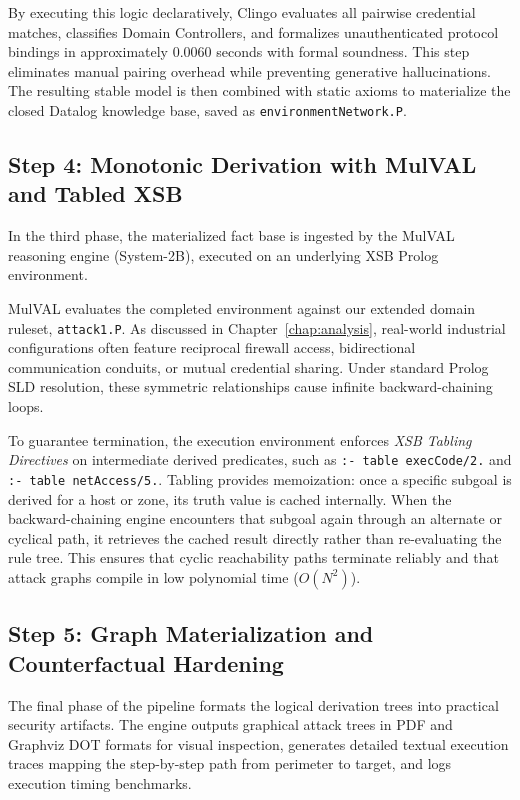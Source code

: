 \documentclass[target=mst,aauheader=aics,style=]{thud}
\begin{document}
By executing this logic declaratively, Clingo evaluates all pairwise credential matches, classifies Domain Controllers, and formalizes unauthenticated protocol bindings in approximately $0.0060$ seconds with formal soundness. This step eliminates manual pairing overhead while preventing generative hallucinations. The resulting stable model is then combined with static axioms to materialize the closed Datalog knowledge base, saved as \texttt{environmentNetwork.P}.

\subsection{Step 4: Monotonic Derivation with MulVAL and Tabled XSB}
In the third phase, the materialized fact base is ingested by the MulVAL reasoning engine (System-2B), executed on an underlying XSB Prolog environment. 

MulVAL evaluates the completed environment against our extended domain ruleset, \texttt{attack1.P}. As discussed in Chapter~\ref{chap:analysis}, real-world industrial configurations often feature reciprocal firewall access, bidirectional communication conduits, or mutual credential sharing. Under standard Prolog SLD resolution, these symmetric relationships cause infinite backward-chaining loops. 

To guarantee termination, the execution environment enforces \textit{XSB Tabling Directives} on intermediate derived predicates, such as \texttt{:- table execCode/2.} and \texttt{:- table netAccess/5.}. Tabling provides memoization: once a specific subgoal is derived for a host or zone, its truth value is cached internally. When the backward-chaining engine encounters that subgoal again through an alternate or cyclical path, it retrieves the cached result directly rather than re-evaluating the rule tree. This ensures that cyclic reachability paths terminate reliably and that attack graphs compile in low polynomial time ($O(N^2)$).

\subsection{Step 5: Graph Materialization and Counterfactual Hardening}
The final phase of the pipeline formats the logical derivation trees into practical security artifacts. The engine outputs graphical attack trees in PDF and Graphviz DOT formats for visual inspection, generates detailed textual execution traces mapping the step-by-step path from perimeter to target, and logs execution timing benchmarks.
\end{document}
